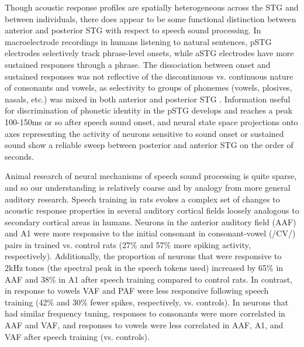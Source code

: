 Though acoustic response profiles are spatially heterogeneous across the STG and between individuals\citep{mesgaraniPhoneticFeatureEncoding2014,hamiltonSpatialMapOnset2018a}, there does appear to be some functional distinction between anterior and posterior STG with respect to speech sound processing. In macroelectrode recordings in humans listening to natural sentences, pSTG electrodes selectively track phrase-level onsets, while aSTG electrodes have more sustained responses through a phrase. The dissociation between onset and sustained responses was not reflective of the discontinuous vs. continuous nature of consonants and vowels, as selectivity to groups of phonemes (vowels, plosives, nasals, etc.) was mixed in both anterior and posterior STG \citep{hamiltonSpatialMapOnset2018a}. Information useful for discrimination of phonetic identity in the pSTG develops and reaches a peak 100-150ms or so after speech sound onset\citep{mesgaraniPhoneticFeatureEncoding2014,changCategoricalSpeechRepresentation2010b}, and neural state space projections onto axes representing the activity of neurons sensitive to sound onset or sustained sound show a reliable sweep between posterior and anterior STG on the order of seconds. 

Animal research of neural mechanisms of speech sound processing is quite sparse, and so our understanding is relatively coarse and by analogy from more general auditory research. Speech training in rats evokes a complex set of changes to acoustic response properties in several auditory cortical fields loosely analogous to secondary cortical areas in humans\citep{engineerSpeechTrainingAlters2015a}. Neurons in the anterior auditory field (AAF) and A1 were more responsive to the initial consonant in consonant-vowel (/CV/) pairs in trained vs. control rats (27\% and 57\% more spiking activity, respectively). Additionally, the proportion of neurons that were responsive to 2kHz tones (the spectral peak in the speech tokens used) increased by 65\% in AAF and 38\% in A1 after speech training compared to control rats. In contrast, in response to vowels VAF and PAF were less responsive following speech training (42\% and 30\% fewer spikes, respectively, vs. controls). In neurons that had similar frequency tuning, responses to consonants were more correlated in AAF and VAF, and responses to vowels were less correlated in AAF, A1, and VAF after speech training (vs. controls)\citep{engineerSpeechTrainingAlters2015a}. 

